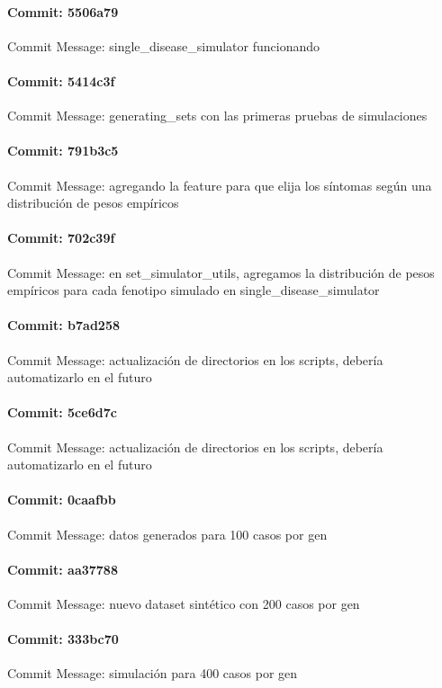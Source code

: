 \documentclass{article}
\begin{document}
\paragraph{Commit: 5506a79}
Commit Message: single_disease_simulator funcionando

\paragraph{Commit: 5414c3f}
Commit Message: generating_sets con las primeras pruebas de simulaciones

\paragraph{Commit: 791b3c5}
Commit Message: agregando la feature para que elija los síntomas según una distribución de pesos empíricos

\paragraph{Commit: 702c39f}
Commit Message: en set_simulator_utils, agregamos la distribución de pesos empíricos para cada fenotipo simulado en single_disease_simulator

\paragraph{Commit: b7ad258}
Commit Message: actualización de directorios en los scripts, debería automatizarlo en el futuro

\paragraph{Commit: 5ce6d7c}
Commit Message: actualización de directorios en los scripts, debería automatizarlo en el futuro

\paragraph{Commit: 0caafbb}
Commit Message: datos generados para 100 casos por gen

\paragraph{Commit: aa37788}
Commit Message: nuevo dataset sintético con 200 casos por gen

\paragraph{Commit: 333bc70}
Commit Message: simulación para 400 casos por gen
\end{document}
